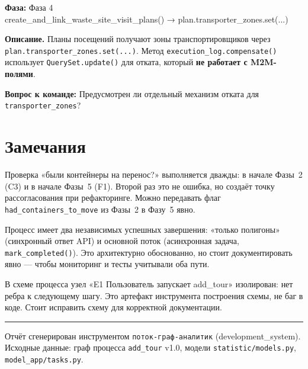 \documentclass[11pt, a4paper, oneside]{article}
\newcommand{\coderef}[1]{{\footnotesize\color{MidGray}\ttfamily #1}}
\begin{document}
\begin{warnbox}[title={⚠️ \#9 — M2M-поля зон транспортировщиков не откатываются стандартным механизмом}]

\textbf{Фаза:} Фаза 4\\
\coderef{create\_and\_link\_waste\_site\_visit\_plans() → plan.transporter\_zones.set(...)}

\textbf{Описание.}
Планы посещений получают зоны транспортировщиков через
\texttt{plan.transporter\_zones.set(...)}.
Метод \texttt{execution\_log.compensate()} использует
\texttt{QuerySet.update()} для отката, который \textbf{не работает с M2M-полями}.

\textbf{Вопрос к команде:} Предусмотрен ли отдельный механизм отката
для \texttt{transporter\_zones}?
\end{warnbox}

\section{Замечания}

\begin{infobox}[title={ℹ️ \#10 — Дублирование проверки наличия переноса}]

Проверка «были контейнеры на перенос?» выполняется дважды:
в начале Фазы~2 (C3) и в начале Фазы~5 (F1).
Второй раз это не ошибка, но создаёт точку рассогласования при рефакторинге.
Можно передавать флаг \texttt{had\_containers\_to\_move}
из Фазы~2 в Фазу~5 явно.
\end{infobox}

\begin{infobox}[title={ℹ️ \#11 — Два терминала успеха в одном процессе}]

Процесс имеет два независимых успешных завершения:
«только полигоны» (синхронный ответ API) и основной поток
(асинхронная задача, \texttt{mark\_completed()}).
Это архитектурно обоснованно, но стоит документировать явно —
чтобы мониторинг и тесты учитывали оба пути.
\end{infobox}

\begin{infobox}[title={ℹ️ \#12 — Точка входа не связана с графом переходов}]

В схеме процесса узел «E1 Пользователь запускает add\_tour» изолирован:
нет ребра к следующему шагу.
Это артефакт инструмента построения схемы, не баг в коде.
Стоит исправить схему для корректной документации.
\end{infobox}



\vfill
\hrule
\vspace{4mm}
{\small\color{MidGray}
  Отчёт сгенерирован инструментом \texttt{поток-граф-аналитик} (development\_system).
  Исходные данные: граф процесса \texttt{add\_tour} v1.0, модели \texttt{statistic/models.py},
  \texttt{model\_app/tasks.py}.
}
\end{document}
